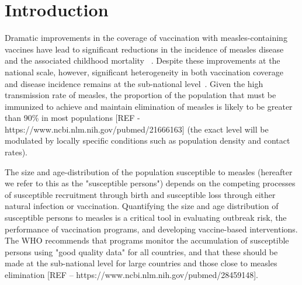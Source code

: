\documentclass[nofootinbib,aps,pre,twocolumn,superscriptaddress,showkeys,showpacs]{revtex4-1}
\begin{document}
\section{Introduction \label{sec:Intro}}
Dramatic improvements in the coverage of vaccination with measles-containing vaccines have lead to significant reductions in the incidence of measles disease and the associated childhood mortality ~\cite{perry_global_2014}. Despite these improvements at the national scale, however, significant heterogeneity in both vaccination coverage and disease incidence remains at the sub-national level~\cite{prada_demographics_2017,takahashi_geography_2017,metcalf_transport_2015}.
Given the high transmission rate of measles, the proportion of the population that must be immunized to achieve and maintain elimination of measles is likely to be greater than 90\% in most populations [REF - https://www.ncbi.nlm.nih.gov/pubmed/21666163] (the exact level will be modulated by locally specific conditions such as population density and contact rates).

The size and age-distribution of the population susceptible to measles (hereafter we refer to this as the "susceptible persons") depends on the competing processes of susceptible recruitment through birth and susceptible loss through either natural infection or vaccination. 
Quantifying the size and age distribution of susceptible persons to measles is a critical tool in evaluating outbreak risk, the performance of vaccination programs, and developing vaccine-based interventions. The WHO recommends that programs monitor the accumulation of susceptible persons using "good quality data" for all countries, and that these should be made at the sub-national level for large countries and those close to measles elimination [REF -- https://www.ncbi.nlm.nih.gov/pubmed/28459148].
\end{document}
